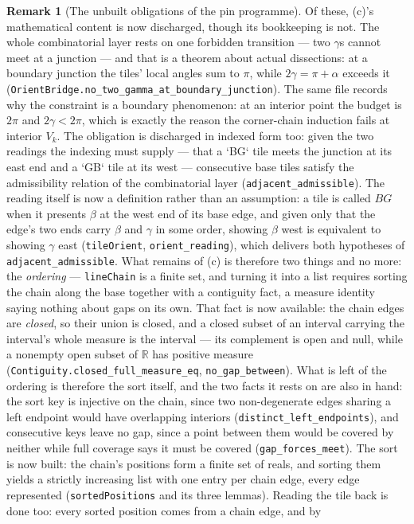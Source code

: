 \documentclass[11pt,reqno]{amsart}
\theoremstyle{plain}
\theoremstyle{definition}
\newtheorem{remark}[theorem]{Remark}
\begin{document}
\begin{remark}[The unbuilt obligations of the pin programme]
Of these, (c)'s mathematical content is now discharged, though its bookkeeping is not. The whole
combinatorial layer rests on one forbidden transition --- two $\gamma$s cannot meet at a junction
--- and that is a theorem about actual dissections: at a boundary junction the tiles' local angles
sum to $\pi$, while $2\gamma=\pi+\alpha$ exceeds it
(\texttt{OrientBridge.no\_two\_gamma\_at\_boundary\_junction}). The same file records why the
constraint is a boundary phenomenon: at an interior point the budget is $2\pi$ and $2\gamma<2\pi$,
which is exactly the reason the corner-chain induction fails at interior $V_k$. The obligation is discharged in indexed form too: given the two readings the indexing must supply
--- that a `BG` tile meets the junction at its east end and a `GB` tile at its west --- consecutive
base tiles satisfy the admissibility relation of the combinatorial layer
(\texttt{adjacent\_admissible}). The reading itself is now a definition rather than an assumption: a tile is called $BG$ when it
presents $\beta$ at the west end of its base edge, and given only that the edge's two ends carry
$\beta$ and $\gamma$ in some order, showing $\beta$ west is equivalent to showing $\gamma$ east
(\texttt{tileOrient}, \texttt{orient\_reading}), which delivers both hypotheses of
\texttt{adjacent\_admissible}. What remains of (c) is therefore two things and no more: the
\emph{ordering} --- \texttt{lineChain} is a finite set, and turning it into a list requires
sorting the chain along the base together with a contiguity fact, a measure identity saying
nothing about gaps on its own. That fact is now available: the chain edges are \emph{closed}, so
their union is closed, and a closed subset of an interval carrying the interval's whole measure is
the interval --- its complement is open and null, while a nonempty open subset of $\mathbb R$ has
positive measure (\texttt{Contiguity.closed\_full\_measure\_eq},
\texttt{no\_gap\_between}). What is left of the ordering is therefore the sort itself, and the two facts it rests on are also
in hand: the sort key is injective on the chain, since two non-degenerate edges sharing a left
endpoint would have overlapping interiors (\texttt{distinct\_left\_endpoints}), and consecutive
keys leave no gap, since a point between them would be covered by neither while full coverage says
it must be covered (\texttt{gap\_forces\_meet}). The sort is now built: the chain's positions form a finite set of reals, and sorting them yields
a strictly increasing list with one entry per chain edge, every edge represented
(\texttt{sortedPositions} and its three lemmas). Reading the tile back is done too: every sorted position comes from a chain edge, and by

\end{remark}
\end{document}
